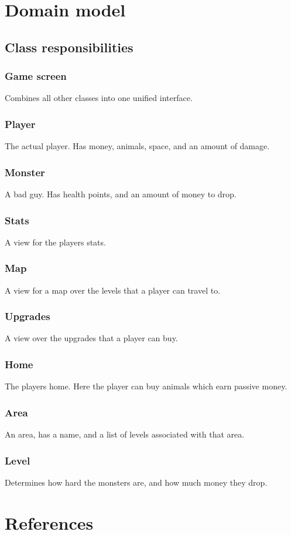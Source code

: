 \documentclass{article}
\begin{document}
\section{Domain model}
\setlength\fboxsep{0pt}
\setlength\fboxrule{0.5pt}

\subsection{Class responsibilities}
\subsubsection{Game screen}
Combines all other classes into one unified interface.
\subsubsection{Player}
The actual player. Has money, animals, space, and an amount of damage.
\subsubsection{Monster}
A bad guy. Has health points, and an amount of money to drop.
\subsubsection{Stats}
A view for the players stats.
\subsubsection{Map}
A view for a map over the levels that a player can travel to.
\subsubsection{Upgrades}
A view over the upgrades that a player can buy.
\subsubsection{Home}
The players home. Here the player can buy animals which earn passive money. 
\subsubsection{Area}
An area, has a name, and a list of levels associated with that area.
\subsubsection{Level}
Determines how hard the monsters are, and how much money they drop.
\section{References}
\end{document}
